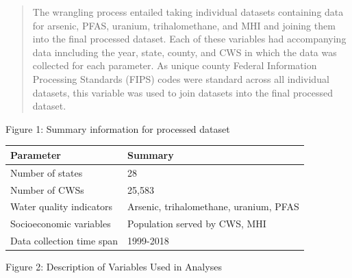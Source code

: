 \documentclass[12pt,]{article}
\begin{document}
\begin{quote}
The wrangling process entailed taking individual datasets containing
data for arsenic, PFAS, uranium, trihalomethane, and MHI and joining
them into the final processed dataset. Each of these variables had
accompanying data inncluding the year, state, county, and CWS in which
the data was collected for each parameter. As unique county Federal
Information Processing Standards (FIPS) codes were standard across all
individual datasets, this variable was used to join datasets into the
final processed dataset.
\end{quote}

Figure 1: Summary information for processed dataset

\begin{longtable}[]{@{}ll@{}}
\toprule
\textbf{Parameter} & \textbf{Summary}\tabularnewline
\midrule
\endhead
Number of states & 28\tabularnewline
Number of CWSs & 25,583\tabularnewline
Water quality indicators & Arsenic, trihalomethane, uranium,
PFAS\tabularnewline
Socioeconomic variables & Population served by CWS, MHI\tabularnewline
Data collection time span & 1999-2018\tabularnewline
\bottomrule
\end{longtable}

Figure 2: Description of Variables Used in Analyses
\end{document}
